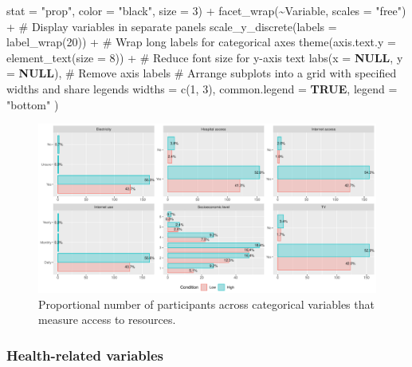 \documentclass[
  bookmarksnumbered]{article}
\newenvironment{Shaded}{\begin{snugshade}}{\end{snugshade}}
\newcommand{\AttributeTok}[1]{\textcolor[rgb]{0.80,0.80,0.80}{#1}}
\newcommand{\CommentTok}[1]{\textcolor[rgb]{0.50,0.62,0.50}{#1}}
\newcommand{\ConstantTok}[1]{\textcolor[rgb]{0.86,0.64,0.64}{\textbf{#1}}}
\newcommand{\DecValTok}[1]{\textcolor[rgb]{0.86,0.86,0.80}{#1}}
\newcommand{\FunctionTok}[1]{\textcolor[rgb]{0.94,0.94,0.56}{#1}}
\newcommand{\NormalTok}[1]{\textcolor[rgb]{0.80,0.80,0.80}{#1}}
\newcommand{\SpecialCharTok}[1]{\textcolor[rgb]{0.86,0.64,0.64}{#1}}
\newcommand{\StringTok}[1]{\textcolor[rgb]{0.80,0.58,0.58}{#1}}
\begin{document}
\begin{Shaded}
\begin{Highlighting}[]
              \AttributeTok{stat =} \StringTok{"prop"}\NormalTok{,}
              \AttributeTok{color =} \StringTok{"black"}\NormalTok{,}
              \AttributeTok{size =} \DecValTok{3}\NormalTok{) }\SpecialCharTok{+}
    \FunctionTok{facet\_wrap}\NormalTok{(}\SpecialCharTok{\textasciitilde{}}\NormalTok{Variable, }\AttributeTok{scales =} \StringTok{"free"}\NormalTok{) }\SpecialCharTok{+}  \CommentTok{\# Display variables in separate panels}
    \FunctionTok{scale\_y\_discrete}\NormalTok{(}\AttributeTok{labels =} \FunctionTok{label\_wrap}\NormalTok{(}\DecValTok{20}\NormalTok{)) }\SpecialCharTok{+}  \CommentTok{\# Wrap long labels for categorical axes}
    \FunctionTok{theme}\NormalTok{(}\AttributeTok{axis.text.y =} \FunctionTok{element\_text}\NormalTok{(}\AttributeTok{size =} \DecValTok{8}\NormalTok{)) }\SpecialCharTok{+}  \CommentTok{\# Reduce font size for y{-}axis text}
    \FunctionTok{labs}\NormalTok{(}\AttributeTok{x =} \ConstantTok{NULL}\NormalTok{, }\AttributeTok{y =} \ConstantTok{NULL}\NormalTok{),  }\CommentTok{\# Remove axis labels}
  \CommentTok{\# Arrange subplots into a grid with specified widths and share legends}
  \AttributeTok{widths =} \FunctionTok{c}\NormalTok{(}\DecValTok{1}\NormalTok{, }\DecValTok{3}\NormalTok{),}
  \AttributeTok{common.legend =} \ConstantTok{TRUE}\NormalTok{,}
  \AttributeTok{legend =} \StringTok{"bottom"}
\NormalTok{)}
\end{Highlighting}
\end{Shaded}

\begin{figure}
\centering
\includegraphics{Supplementary_material_files/figure-latex/resource-desc-plot-1.pdf}
\caption{\label{fig:resource-desc-plot}Proportional number of participants across categorical variables that measure access to resources.}
\end{figure}

\subsubsection{Health-related variables}\label{health-related-variables}
\end{document}
